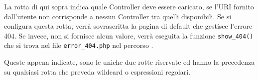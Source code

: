 
La rotta di qui sopra indica quale Controller deve essere caricato, se l'\ac{URI} fornito dall'utente non corrisponde a nessun Controller tra quelli disponibili. Se si configura questa rotta, verrà sovrascritta la pagina di default che gestisce l'errore 404. Se invece, non si fornisce alcun valore, verrà eseguita la funzione \verb|show_404()| che si trova nel file \verb|error_404.php| nel percorso .

Queste appena indicate, sono le uniche due rotte riservate ed hanno la precedenza su qualsiasi rotta che preveda wildcard o espressioni regolari.